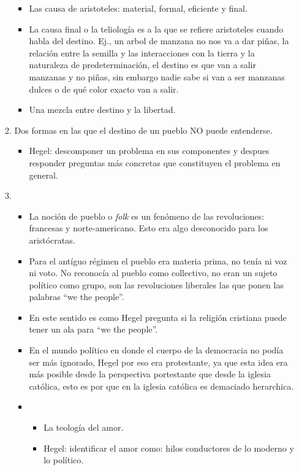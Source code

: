 \begin{enumerate}
\begin{enumerate}
\begin{itemize}
                    \item Las causa de aristoteles: material, formal, eficiente y final.
                    \item La causa final o la teliología es a la que se refiere aristoteles cuando habla del destino. Ej., un arbol de manzana no nos va a dar piñas, la relación entre la semilla y las interacciones con la tierra y la naturaleza de predeterminación, el destino es que van a salir manzanas y no piñas, sin embargo nadie sabe si van a ser manzanas dulces o de qué color exacto van a salir. 
                    \item Una mezcla entre destino y la libertad. 
                \end{itemize}

            \item Dos formas en las que el destino de un pueblo NO puede entenderse.
                \begin{itemize}
                    \item Hegel: descomponer un problema en sus componentes y despues responder preguntas más concretas que constituyen el problema en general. 
                \end{itemize}
                
            \item {}  
                \begin{itemize}
                    \item La noción de pueblo o \emph{folk} es un fenómeno de las revoluciones: francesas y norte-americano. Esto era algo desconocido para los aristócratas. 
                    \item Para el antíguo régimen el pueblo era materia prima, no tenía ni voz ni voto. No reconocía al pueblo como collectivo, no eran un sujeto político como grupo, son las revoluciones liberales las que ponen las palabras ``we the people''.
                    \item En este sentido es como Hegel pregunta si la religión cristiana puede tener un ala para ``we the people''. 
                    \item En el mundo político en donde el cuerpo de la democracia no podía ser más ignorado, Hegel por eso era protestante, ya que esta idea era más posible desde la perspectiva portestante que desde la iglesia católica, esto es por que en la iglesia católica es demaciado herarchica.
                    \item {} 
                        \begin{itemize}
                            \item La teología del amor.
                            \item Hegel: identificar el amor como: hilos conductores de lo moderno y lo político. 
                        \end{itemize}
                \end{itemize}


\end{enumerate}
\end{enumerate}
